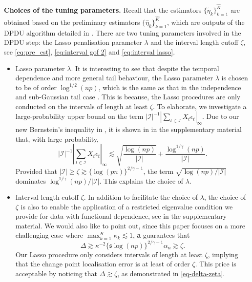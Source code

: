 \documentclass[11pt]{article}
\newcommand{\s}{ { \mathfrak{s}  } }
\theoremstyle{plain}
\theoremstyle{definition}
\begin{document}
\medskip
\noindent \textbf{Choices of the tuning parameters.}  Recall that the estimators $\{\widetilde{\eta}_k\}_{k = 1}^{\widehat{K}}$ are obtained based on the preliminary estimators $\{\widehat{\eta}_k\}_{k = 1}^{\widehat{K}}$, which are outputs of the DPDU algorithm detailed in .  There are two tuning parameters involved in the DPDU step: the Lasso penalisation parameter $\lambda$ and the interval length cutoff $\zeta$, see \eqref{eq:pre_est}, \eqref{eq:interval gof 2} and \eqref{eq:interval lasso}.  
\begin{itemize}
    \item Lasso parameter $\lambda$.  It is interesting to see that despite the temporal dependence and more general tail behaviour, the Lasso parameter $\lambda$ is chosen to be of order $\log^{1/2}(np)$, which is the same as that in the independence and sub-Gaussian tail case \citep[e.g.][]{buhlmann2011statistics}.  This is because, the Lasso procedures are only conducted on the intervals of length at least $\zeta$.  To elaborate, we investigate a large-probability upper bound on the term $|\mathcal{I}|^{-1}| \sum_{t \in \mathcal{I}} X_t\epsilon_t|_{\infty}$.  Due to our new Bernstein's inequality in , it is shown in  in the supplementary material that, with large probability,
    \[
        |\mathcal{I}|^{-1}| \sum_{t \in \mathcal{I}} X_t\epsilon_t|_{\infty} \lesssim \sqrt{\frac{\log(np)}{|\mathcal{I}|}} + \frac{\log^{1/\gamma}(np)}{|\mathcal{I}|}.
    \]
    Provided that $|\mathcal{I}| \geq \zeta \gtrsim \{\log(pn)\}^{2/\gamma - 1}$, the term $\sqrt{\log(np)/|\mathcal{I}|}$ dominates $\log^{1/\gamma}(np)/|\mathcal{I}|$.  This explains the choice of $\lambda$.
    \item Interval length cutoff $\zeta$.  In addition to facilitate the choice of $\lambda$, the choice of $\zeta$ is also to enable the application of a restricted eigenvalue condition we provide for data with functional dependence, see  in the supplementary material.  We would also like to point out, since this paper focuses on a more challenging case where $\max_{k = 1}^K \kappa_k \lesssim 1$, \textbf{a} guarantees that 
    \begin{equation}\label{eq-delta-zeta}
        \Delta \gtrsim \kappa^{-2} \{\s\log(np)\}^{2/\gamma-1} \alpha_n \gtrsim \zeta. 
    \end{equation}
    Our Lasso procedure only considers intervals of length at least $\zeta$, implying that the change point localisation error is at least of order $\zeta$. This price is acceptable by noticing that $\Delta \gtrsim \zeta$, as demonstrated in \eqref{eq-delta-zeta}.
\end{itemize}
\end{document}
